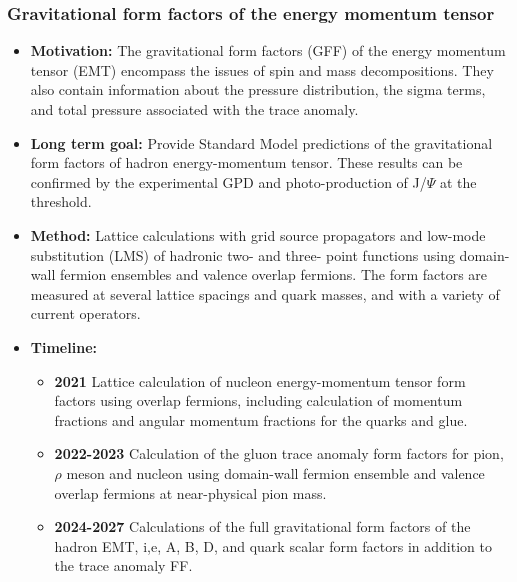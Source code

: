 \documentclass[12pt,hyperpdf]{article}
\begin{document}
\subsubsection{Gravitational form factors of the energy momentum tensor}
\begin{itemize}
    \item{\bf Motivation:} The gravitational form factors (GFF) of the
      energy momentum tensor (EMT) encompass the issues of spin and
      mass decompositions. They also contain information about the
      pressure distribution, the sigma terms, and total pressure
      associated with the trace anomaly. 
    \item{\bf Long term goal:} Provide Standard Model predictions of the
      gravitational form factors of hadron energy-momentum
      tensor. These results can be confirmed by the experimental GPD
      and  photo-production of J/$\Psi$ at the threshold. 
    \item{\bf Method:} Lattice calculations with grid source propagators
      and low-mode substitution (LMS) of hadronic two- and three-
      point functions using domain-wall fermion ensembles and valence
      overlap fermions. The form factors are measured at several
      lattice spacings and quark masses, and with a variety of current
      operators.  
\item{\bf Timeline:}
\begin{itemize}
    \item{\bf 2021} Lattice calculation of nucleon energy-momentum tensor
      form factors using overlap fermions, including calculation of
      momentum fractions and angular momentum fractions for the quarks
      and glue. 
    \item{\bf 2022-2023} Calculation of the gluon trace anomaly form
      factors for pion, $\rho$ meson and nucleon using domain-wall
      fermion ensemble and valence overlap fermions at near-physical
      pion mass. 
    \item{\bf 2024-2027} Calculations of the full gravitational form
      factors of the hadron EMT, i,e, A, B, D, and quark scalar form
      factors in addition to the trace anomaly FF.  
\end{itemize}
\end{itemize}




\end{document}
